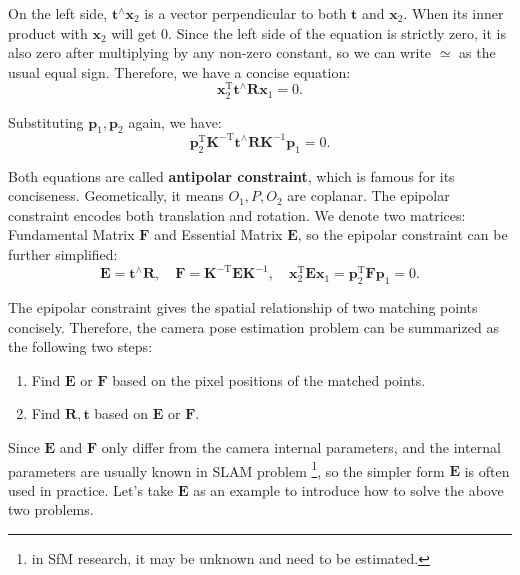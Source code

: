 On the left side, $\mathbf{t}^\wedge \mathbf{x}_2$ is a vector perpendicular to both $\mathbf{t}$ and $\mathbf{x}_2$. When its inner product with $\mathbf{x}_2$ will get 0. Since the left side of the equation is strictly zero, it is also zero after multiplying by any non-zero constant, so we can write $\simeq$ as the usual equal sign. Therefore, we have a concise equation:
\begin{equation}
 \mathbf{x}_2^\mathrm{T} \mathbf{t}^\wedge \mathbf{R} \mathbf{x}_1 = 0.
\end{equation}

Substituting $\mathbf{p}_1, \mathbf{p}_2$ again, we have:
\begin{equation}
\mathbf{p}_2^\mathrm{T} \mathbf{K}^{-\mathrm{T}} \mathbf{t}^\wedge \mathbf{R} \mathbf{K}^{-1} \mathbf{p}_1  = 0.
\end{equation}

Both equations are called \textbf{antipolar constraint}, which is famous for its conciseness. Geometically, it means $O_1, P, O_2$ are coplanar. The epipolar constraint encodes both translation and rotation. We denote two matrices: Fundamental Matrix $\mathbf{F}$ and Essential Matrix $\mathbf{E}$, so the epipolar constraint can be further simplified:
\begin{equation}
\mathbf{E} = \mathbf{t}^ \wedge \mathbf{R}, \quad \mathbf{F} = \mathbf{K}^{ -\mathrm{T}} \mathbf{E} {\mathbf{K}^{ - 1}}, \quad \mathbf{x}_2^\mathrm{T} \mathbf{E} {\mathbf{x}_1} = \mathbf{p}_2^\mathrm{T} \mathbf{F} {\mathbf{p}_1} = 0.
\end{equation}

The epipolar constraint gives the spatial relationship of two matching points concisely. Therefore, the camera pose estimation problem can be summarized as the following two steps:

\begin{enumerate}
	\item Find $\mathbf{E}$ or $\mathbf{F}$ based on the pixel positions of the matched points.
	\item Find $\mathbf{R}, \mathbf{t}$ based on $\mathbf{E}$ or $\mathbf{F}$.
\end{enumerate}

Since $\mathbf{E}$ and $\mathbf{F}$ only differ from the camera internal parameters, and the internal parameters are usually known in SLAM problem \footnote{ in SfM research, it may be unknown and need to be estimated. }, so the simpler form $\mathbf{E}$ is often used in practice. Let's take $\mathbf{E}$ as an example to introduce how to solve the above two problems.

